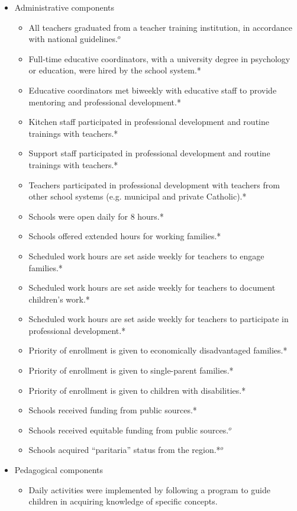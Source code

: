 \begin{itemize}
 \item Administrative components
 \begin{itemize}
 	\item All teachers graduated from a teacher training institution, in accordance with national guidelines.$^o$
 	\item Full-time educative coordinators, with a university degree in psychology or education, were hired by the school system.*
 	\item Educative coordinators met biweekly with educative staff to provide mentoring and professional development.*
 	\item Kitchen staff participated in professional development and routine trainings with teachers.*
 	\item Support staff participated in professional development and routine trainings with teachers.*
 	\item Teachers participated in professional development with teachers from other school systems (e.g. municipal and private Catholic).*
 	\item Schools were open daily for 8 hours.*
 	\item Schools offered extended hours for working families.*
 	\item Scheduled work hours are set aside weekly for teachers to engage families.*
 	\item Scheduled work hours are set aside weekly for teachers to document children's work.*
 	\item Scheduled work hours are set aside weekly for teachers to participate in professional development.*
 	\item Priority of enrollment is given to economically disadvantaged families.*
 	\item Priority of enrollment is given to single-parent families.*
 	\item Priority of enrollment is given to children with disabilities.*
 	\item Schools received funding from public sources.*
	\item Schools received equitable funding from public sources.$^o$
	\item Schools acquired ``paritaria'' status from the region.*$^o$
 \end{itemize}
 \item Pedagogical components
 \begin{itemize}
 	\item Daily activities were implemented by following a program to guide children in acquiring knowledge of specific concepts.

\end{itemize}
\end{itemize}

